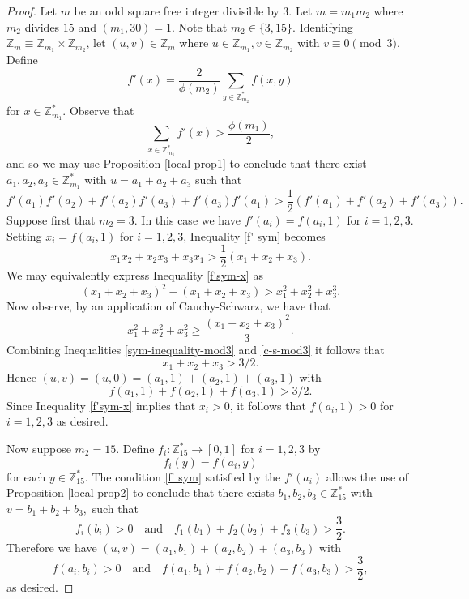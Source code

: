 \documentclass[a4paper,11pt,twoside]{amsart}
\theoremstyle{definition}
\numberwithin{equation}{section}
\newcommand\Z{\mathbb{Z}}
\begin{document}
\begin{proof}
Let $m$ be an odd square free integer divisible by $3$. Let $m = m_1m_2$ where $m_2$ divides $15$ and $(m_1,30) = 1$. Note that $m_2 \in \{3,15\}$. Identifying $\Z_m \equiv \Z_{m_1} \times \Z_{m_2}$, let $(u,v) \in \Z_m$ where $u \in \Z_{m_1}, v \in \Z_{m_2}$ with $v \equiv 0 \pmod{3}$. Define $$f'(x) = \frac{2}{\phi(m_2)}\sum_{y \in \Z_{m_2}^*}f(x,y)$$ for $x \in \Z_{m_1}^*$. Observe that 
$$\sum_{x \in \Z_{m_1}^*}f'(x) > \frac{\phi(m_1)}{2},
$$
and so we may use Proposition \ref{local-prop1} to conclude that there exist $a_1,a_2,a_3 \in \Z_{m_1}^*$ with $u = a_1 + a_2 + a_3$ such that \begin{equation} \label{f' sym}
    f'(a_1)f'(a_2) + f'(a_2)f'(a_3) + f'(a_3)f'(a_1) > \frac{1}{2}(f'(a_1) + f'(a_2) + f'(a_3)).
\end{equation} 
Suppose first that $m_2 = 3$. In this case we have $f'(a_i) = f(a_i,1)$ for $i = 1,2,3$. Setting $x_i = f(a_i,1)$ for $i = 1 ,2,3$, Inequality \eqref{f' sym} becomes
\begin{equation}\label{f'sym-x}
 x_1x_2 + x_2x_3 + x_3x_1 > \frac{1}{2}(x_1+x_2+x_3).   
\end{equation}
We may equivalently express Inequality \ref{f'sym-x} as 
\begin{equation}\label{sym-inequality-mod3}
    (x_1+x_2+x_3)^2 - (x_1+x_2+x_3) > x_1^2+x_2^2+x_3^3.
\end{equation}
Now observe, by an application of Cauchy-Schwarz, we have that 
\begin{equation}\label{c-s-mod3}
    x_1^2 + x_2^2 + x_3^2 \geq \frac{(x_1+x_2+x_3)^2}{3}.
\end{equation}
Combining Inequalities \eqref{sym-inequality-mod3} and \eqref{c-s-mod3} it follows that
$$
x_1 + x_2 + x_3 > 3/2.
$$
Hence $(u,v) = (u,0) = (a_1,1) + (a_2,1) + (a_3,1)$ with $$f(a_1,1) + f(a_2,1) + f(a_3,1) > 3/2.$$ Since Inequality \ref{f'sym-x} implies that $x_i > 0$, it follows that $f(a_i,1) > 0$ for $i = 1,2,3$ as desired.

Now suppose $m_2 = 15$. Define $f_i : \Z_{15}^* \rightarrow [0,1]$ for $i = 1,2,3$ by $$f_i(y) = f(a_i,y)$$ for each $y \in \Z_{15}^*.$ 
The condition \eqref{f' sym} satisfied by the $f'(a_i)$ allows the use of Proposition \ref{local-prop2} to conclude that there exists $b_1,b_2,b_3 \in \Z_{15}^*$ with $v = b_1 + b_2 + b_3,$ such that \[f_i(b_i) > 0 \quad \textrm{and} \quad f_1(b_1) + f_2(b_2) + f_3(b_3) > \frac{3}{2}.\] Therefore we have $(u,v) = (a_1,b_1) + (a_2,b_2) + (a_3,b_3)$ with \[f(a_i,b_i) > 0 \quad \textrm{and} \quad f(a_1,b_1) + f(a_2,b_2) + f(a_3,b_3) > \frac{3}{2},\] as desired.
    
\end{proof}
\end{document}
